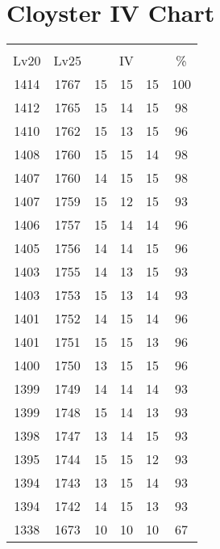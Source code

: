 \documentclass{article}%
\begin{document}
%
\normalsize%
\section{Cloyster IV Chart}%
\label{sec:Cloyster IV Chart}%
\renewcommand{\arraystretch}{1.5}%
\begin{tabular}{|c|c|c|c|c|c|}%
\hline%
\multicolumn{6}{|c|}{\textcolor{white}{ 
\linebreak{Cloyster}
}%
\cellcolor{black}}\\%
\multicolumn{1}{|c}{Lv20}&\multicolumn{1}{c|}{Lv25}&\multicolumn{3}{c|}{IV}&\multicolumn{1}{|c|}{\%}\\%
\hline%
\rowcolor{color100}%
1414&1767&15&15&15&100\\%
\hline%
\rowcolor{color98}%
1412&1765&15&14&15&98\\%
\hline%
\rowcolor{color96}%
1410&1762&15&13&15&96\\%
\hline%
\rowcolor{color98}%
1408&1760&15&15&14&98\\%
\hline%
\rowcolor{color98}%
1407&1760&14&15&15&98\\%
\hline%
\rowcolor{color93}%
1407&1759&15&12&15&93\\%
\hline%
\rowcolor{color96}%
1406&1757&15&14&14&96\\%
\hline%
\rowcolor{color96}%
1405&1756&14&14&15&96\\%
\hline%
\rowcolor{color93}%
1403&1755&14&13&15&93\\%
\hline%
\rowcolor{color93}%
1403&1753&15&13&14&93\\%
\hline%
\rowcolor{color96}%
1401&1752&14&15&14&96\\%
\hline%
\rowcolor{color96}%
1401&1751&15&15&13&96\\%
\hline%
\rowcolor{color96}%
1400&1750&13&15&15&96\\%
\hline%
\rowcolor{color93}%
1399&1749&14&14&14&93\\%
\hline%
\rowcolor{color93}%
1399&1748&15&14&13&93\\%
\hline%
\rowcolor{color93}%
1398&1747&13&14&15&93\\%
\hline%
\rowcolor{color93}%
1395&1744&15&15&12&93\\%
\hline%
\rowcolor{color93}%
1394&1743&13&15&14&93\\%
\hline%
\rowcolor{color93}%
1394&1742&14&15&13&93\\%
\hline%
\rowcolor{color91}%
1338&1673&10&10&10&67\\%
\end{tabular}

%
\end{document}
